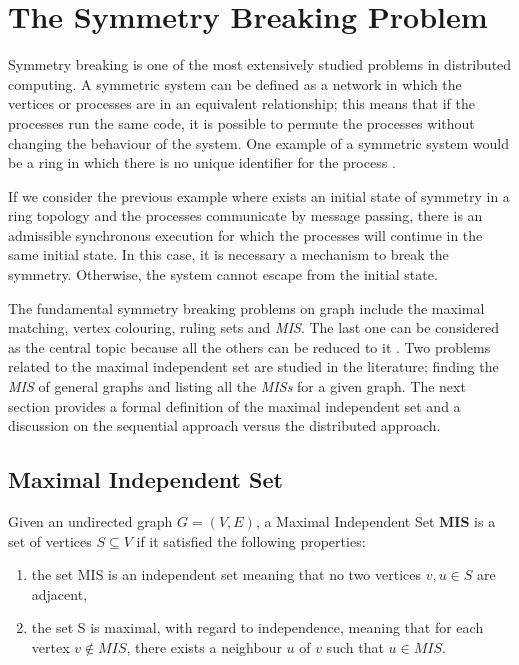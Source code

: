 \section{The Symmetry Breaking Problem}
\label{cap:2}


Symmetry breaking is one of the most extensively studied problems in distributed computing. A symmetric system can be defined as a network in which the vertices or processes are in an equivalent relationship; this means that if the processes run the same code, it is possible to permute the processes without changing the behaviour of the system. One example of a symmetric system would be a ring in which there is no unique identifier for the process \cite{boldi1996symmetry}.  

If we consider the previous example where exists an initial state of symmetry in a ring topology and the processes communicate by message passing, there is an admissible synchronous execution for which the processes will continue in the same initial state. In this case, it is necessary a mechanism to break the symmetry. Otherwise, the system cannot escape from the initial state.

The fundamental symmetry breaking problems on graph include the maximal matching, vertex colouring, ruling sets and \textit{MIS}. The last one can be considered as the central topic because all the others can be reduced to it \cite{linial1992locality}. Two problems related to the maximal independent set are studied in the literature; finding the \textit{MIS} of general graphs and listing all the \textit{MISs} for a given graph. The next section provides a formal definition of the maximal independent set and a discussion on the sequential approach versus the distributed approach.

\subsection{Maximal Independent Set}

\theoremstyle{definition}
\begin{definition}

Given an undirected graph $G = (V,E)$, a Maximal Independent Set \textbf{MIS} is a set of vertices $S \subseteq V$ if it satisfied the following properties:   

\begin{enumerate}
  \item the set MIS is an independent set meaning that no two vertices $v,u \in S$ are adjacent,
  \item the set S is maximal, with regard to independence, meaning that for each vertex $v \notin MIS$, there exists a neighbour $u$ of $v$ such that $u \in MIS$.
\end{enumerate}

\end{definition}

